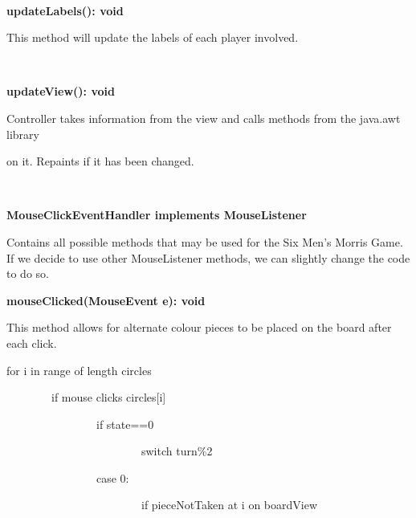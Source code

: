 \documentclass{article}
\begin{document}
~{}

{\textbf{updateLabels(): void}}

{This method will update the labels of each player involved.}

{~}

{\textbf{updateView(): void}}

{Controller takes information from the view and calls methods from the
java.awt library}

{on it. Repaints if it has been changed.~~~~~~~~}

{~}

{\textbf{MouseClickEventHandler implements MouseListener}}

{Contains all possible methods that may be used for the Six Men's Morris Game. If we decide to use other MouseListener methods, we can slightly
change the code to do so.}

{}

{\textbf{mouseClicked(MouseEvent e): void}}

{This method allows for alternate colour pieces to be placed on the
board after each click.}

{for i in range of length circles}

{~~~~~~~~if mouse clicks circles{[}i{]}}

{~~~~~~~~~~~~~~~~if state==0}

{~~~~~~~~~~~~~~~~~~~~~~~~switch turn\%2}

{~~~~~~~~~~~~~~~~case 0:}

{~~~~~~~~~~~~~~~~~~~~~~~~if pieceNotTaken at i on boardView}
\end{document}
